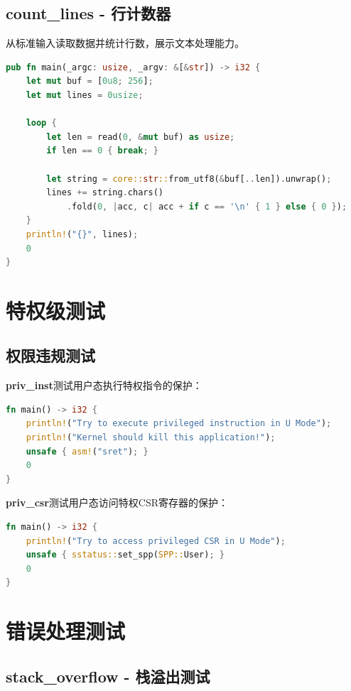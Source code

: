 \subsection{count\_lines - 行计数器}

从标准输入读取数据并统计行数，展示文本处理能力。

\begin{lstlisting}[language=Rust]
pub fn main(_argc: usize, _argv: &[&str]) -> i32 {
    let mut buf = [0u8; 256];
    let mut lines = 0usize;
    
    loop {
        let len = read(0, &mut buf) as usize;
        if len == 0 { break; }
        
        let string = core::str::from_utf8(&buf[..len]).unwrap();
        lines += string.chars()
            .fold(0, |acc, c| acc + if c == '\n' { 1 } else { 0 });
    }
    println!("{}", lines);
    0
}
\end{lstlisting}

\section{特权级测试}

\subsection{权限违规测试}

\textbf{priv\_inst}测试用户态执行特权指令的保护：

\begin{lstlisting}[language=Rust]
fn main() -> i32 {
    println!("Try to execute privileged instruction in U Mode");
    println!("Kernel should kill this application!");
    unsafe { asm!("sret"); }
    0
}
\end{lstlisting}

\textbf{priv\_csr}测试用户态访问特权CSR寄存器的保护：

\begin{lstlisting}[language=Rust]
fn main() -> i32 {
    println!("Try to access privileged CSR in U Mode");
    unsafe { sstatus::set_spp(SPP::User); }
    0
}
\end{lstlisting}

\section{错误处理测试}

\subsection{stack\_overflow - 栈溢出测试}


